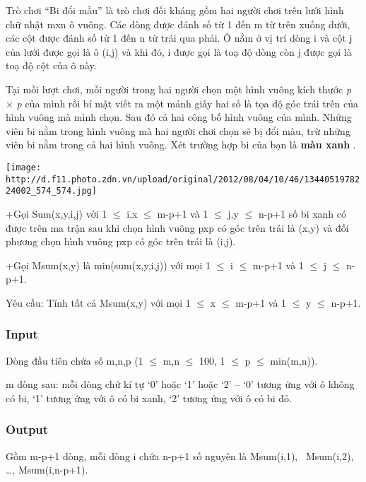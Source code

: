 



   Trò chơi “Bi đổi mầu” là trò chơi đối kháng gồm hai người chơi trên lưới hình chữ nhật                                                   mxn ô vuông. Các dòng được đánh số từ 1 đến    m từ trên xuống dưới, các cột được đánh số từ 1 đến    n từ trái qua phải. Ô nằm ở vị trí dòng    i và cột j    của lưới được gọi là ô (i,j) và khi đó, i được gọi là toạ độ dòng còn j được gọi là toạ độ cột của ô này.  

   Tại mỗi lượt chơi, mỗi người trong hai người chọn một hình vuông kích thước   \emph{    p   }   ×   \emph{    p   }   của mình rồi bí mật viết ra một mảnh giấy hai số là tọa độ góc trái trên của hình vuông mà mình chọn. Sau đó cả hai công bố hình vuông của mình. Những viên bi nằm trong hình vuông mà hai người chơi chọn sẽ bị đổi màu, trừ những viên bi nằm trong cả hai hình vuông. Xét trường hợp bi của bạn là   \textbf{    màu xanh   }   .  




\texttt{[image: http://d.f11.photo.zdn.vn/upload/original/2012/08/04/10/46/1344051978224002\_574\_574.jpg]}

   +Gọi Sum(x,y,i,j) với 1 $\le$ i,x $\le$ m-p+1 và 1 $\le$ j,y $\le$ n-p+1 số bi xanh có được trên ma trận sau khi chọn hình vuông pxp có góc trên trái là (x,y) và đối phương chọn hình vuông pxp có góc trên trái là (i,j).  

   +Gọi Msum(x,y) là min(sum(x,y,i,j)) với mọi 1 $\le$ i $\le$ m-p+1 và 1 $\le$ j $\le$ n-p+1.  

   Yêu cầu: Tính tất cả Msum(x,y) với mọi 1 $\le$ x $\le$ m-p+1 và 1 $\le$ y $\le$ n-p+1.  

\subsubsection{   Input  }

   Dòng đầu tiên chứa số m,n,p (1 $\le$ m,n $\le$ 100, 1 $\le$ p $\le$ min(m,n)).  

   m dòng sau: mỗi dòng chứ kí tự ‘0’ hoặc ‘1’ hoặc ‘2’ – ‘0’ tương ứng với ô không có bi, ‘1’ tương ứng với ô có bi xanh, ‘2’ tương ứng với ô có bi đỏ.  

\subsubsection{   Output  }

   Gồm m-p+1 dòng, mỗi dòng i chứa n-p+1 số nguyên là Msum(i,1),  Msum(i,2), …, Msum(i,n-p+1).  

